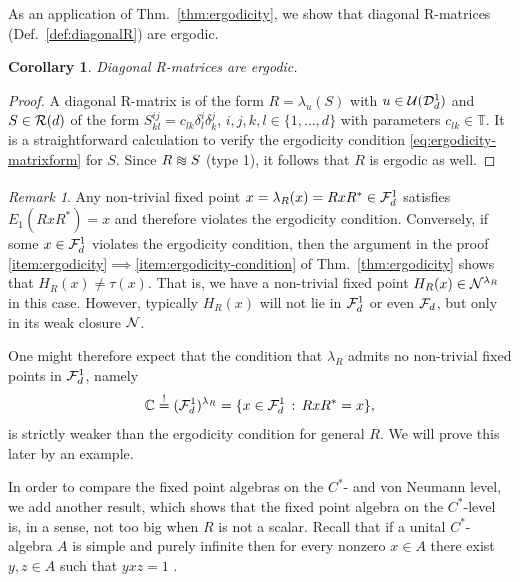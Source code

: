 \documentclass[12pt,a4paper]{amsart}
\numberwithin{equation}{section}
\newtheorem{corollary}[theorem]{Corollary}
\theoremstyle{remark}
\newtheorem{remark}[theorem]{Remark}
\newcommand{\Cl}{\mathbb{C}}
\def\T{\mathbb{T}}
\newcommand{\la}{\lambda}
\newcommand{\CU}[0]{\mathcal{U}} \newcommand{\CV}[0]{\mathcal{V}}
\def\apeqA{\SavedStyle\sim}
\def\Msim{\setstackgap{L}{\dimexpr.5pt+1.5\LMpt}\ensurestackMath{%
  \ThisStyle{\mathrel{\Centerstack{{\apeqA} {\apeqA} {\apeqA}}}}}}
\begin{document}
As an application of Thm.~\ref{thm:ergodicity}, we show that diagonal R-matrices (Def.~\ref{def:diagonalR}) are ergodic. 

\begin{corollary}\label{cor:diagonalsareergodic}
    Diagonal R-matrices are ergodic.
\end{corollary}
\begin{proof}
	A diagonal R-matrix is of the form $R=\la_u(S)$ with $u\in\CU(\CD_d^1)$ and $S\in\mathcal{R}(d)$ of the form $S^{ij}_{kl}=c_{lk}\delta^i_l\delta^j_k$, $i,j,k,l\in\{1,\ldots,d\}$ with parameters $c_{lk}\in\T$. It is a straightforward calculation to verify the ergodicity condition \eqref{eq:ergodicity-matrixform} for $S$. Since $R\Msim S$ (type 1), it follows that $R$ is ergodic as well.
\end{proof}

\begin{remark}
    Any non-trivial fixed point $x=\la_R(x)=RxR^*\in\CF_d^1$ satisfies $E_1(RxR^*)=x$ and therefore violates the ergodicity condition. Conversely, if some $x\in\mathcal{F}_d^1$ violates the ergodicity condition, then the argument in the proof \ref{item:ergodicity}$\implies$\ref{item:ergodicity-condition} of Thm.~\ref{thm:ergodicity} shows that $H_R(x)\neq\tau(x)$. That is, we have a non-trivial fixed point $H_R(x)\in\CN^{\la_R}$ in this case. However, typically $H_R(x)$ will not lie in $\mathcal{F}_d^1$ or even $\mathcal{F}_d$, but only in its weak closure $\mathcal{N}$.
    
    One might therefore expect that the condition that $\la_R$ admits no non-trivial fixed points in $\mathcal{F}_d^1$, namely
    \begin{align}\label{eq:F1ergodicity}
        \Cl\stackrel{!}{=}(\CF_d^1)^{\la_R}=\{x\in\CF_d^1\,:\,RxR^*=x\},
    \end{align}
    is strictly weaker than the ergodicity condition for general $R$. We will prove this later by an example.
\end{remark}

In order to compare the fixed point algebras on the $C^*$- and von Neumann level, we add another result,  which shows that the fixed point algebra on the $C^*$-level is, in a sense, not too big when $R$ is not a scalar. Recall that if a unital $C^*$-algebra $A$ is simple and purely infinite then for every nonzero $x\in A$ there exist $y,z \in A$ such that $yxz=1$ \cite[Thm.~V.5.5]{Davidson:1996_2}.
\end{document}
